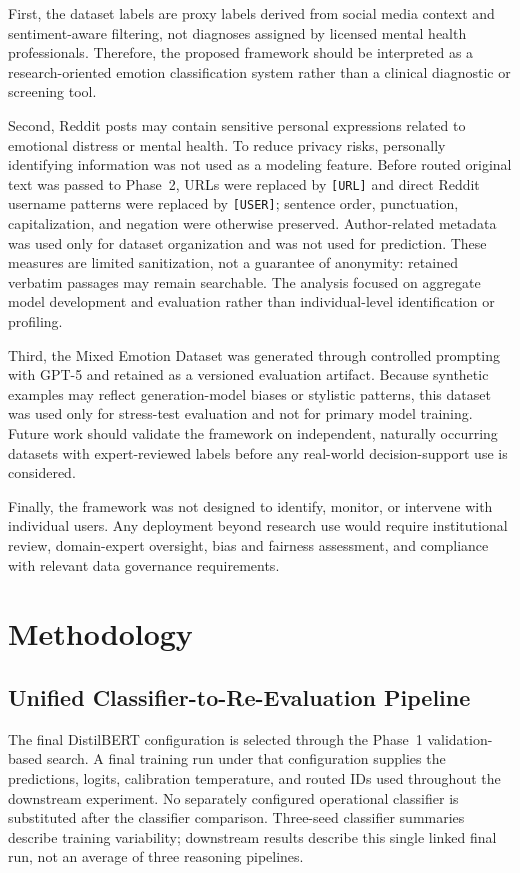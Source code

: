 \documentclass{ieeeaccess}
\begin{document}
First, the dataset labels are proxy labels derived from social media context and sentiment-aware filtering, not diagnoses assigned by licensed mental health professionals. Therefore, the proposed framework should be interpreted as a research-oriented emotion classification system rather than a clinical diagnostic or screening tool.

Second, Reddit posts may contain sensitive personal expressions related to emotional distress or mental health. To reduce privacy risks, personally identifying information was not used as a modeling feature. Before routed original text was passed to Phase~2, URLs were replaced by \texttt{[URL]} and direct Reddit username patterns were replaced by \texttt{[USER]}; sentence order, punctuation, capitalization, and negation were otherwise preserved. Author-related metadata was used only for dataset organization and was not used for prediction. These measures are limited sanitization, not a guarantee of anonymity: retained verbatim passages may remain searchable. The analysis focused on aggregate model development and evaluation rather than individual-level identification or profiling.

Third, the Mixed Emotion Dataset was generated through controlled prompting with GPT-5 and retained as a versioned evaluation artifact. Because synthetic examples may reflect generation-model biases or stylistic patterns, this dataset was used only for stress-test evaluation and not for primary model training. Future work should validate the framework on independent, naturally occurring datasets with expert-reviewed labels before any real-world decision-support use is considered.

Finally, the framework was not designed to identify, monitor, or intervene with individual users. Any deployment beyond research use would require institutional review, domain-expert oversight, bias and fairness assessment, and compliance with relevant data governance requirements.

\section{Methodology}
\subsection{Unified Classifier-to-Re-Evaluation Pipeline}
The final DistilBERT configuration is selected through the Phase~1 validation-based search. A final training run under that configuration supplies the predictions, logits, calibration temperature, and routed IDs used throughout the downstream experiment. No separately configured operational classifier is substituted after the classifier comparison. Three-seed classifier summaries describe training variability; downstream results describe this single linked final run, not an average of three reasoning pipelines.
\end{document}
